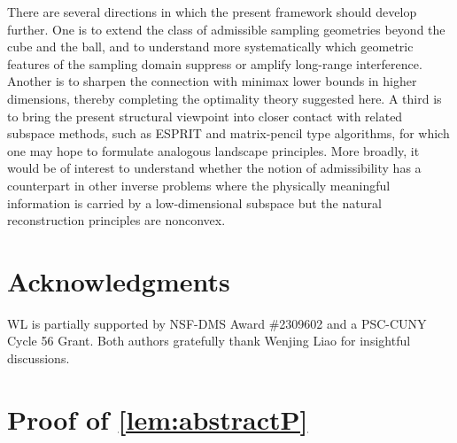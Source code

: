 \documentclass[11pt]{article}
\theoremstyle{definition}
\numberwithin{theorem}{section}
\numberwithin{lemma}{section}
\numberwithin{equation}{section}
\numberwithin{equation}{section}
\begin{document}
There are several directions in which the present framework should develop further. One is to extend the class of admissible sampling geometries beyond the cube and the ball, and to understand more systematically which geometric features of the sampling domain suppress or amplify long-range interference. Another is to sharpen the connection with minimax lower bounds in higher dimensions, thereby completing the optimality theory suggested here. A third is to bring the present structural viewpoint into closer contact with related subspace methods, such as ESPRIT and matrix-pencil type algorithms, for which one may hope to formulate analogous landscape principles. More broadly, it would be of interest to understand whether the notion of admissibility has a counterpart in other inverse problems where the physically meaningful information is carried by a low-dimensional subspace but the natural reconstruction principles are nonconvex.
	 
	\section*{Acknowledgments}
	
	WL is partially supported
	by NSF-DMS Award \#2309602 and a PSC-CUNY Cycle 56 Grant. Both authors gratefully thank Wenjing Liao for insightful discussions. 





\appendix
    
    	\section{Proof of \cref{lem:abstractP}}
	\label{proof:abstractP}
	
\end{document}
